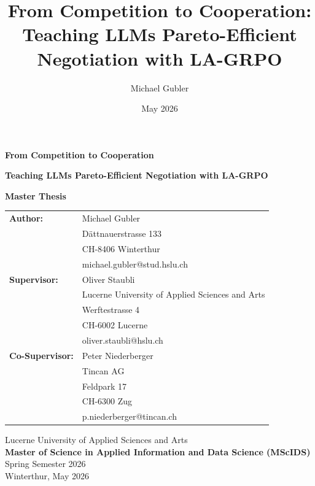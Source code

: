 \documentclass[12pt,a4paper]{article}
\title{From Competition to Cooperation:\\Teaching LLMs Pareto-Efficient Negotiation with LA-GRPO}
\author{Michael Gubler}
\date{May 2026}
\begin{document}
\begin{titlepage}
    \thispagestyle{empty}
    \centering

    {\LARGE \textbf{From Competition to Cooperation}\par}
    \vspace{0.4cm}
    {\large \textbf{Teaching LLMs Pareto-Efficient Negotiation with LA-GRPO}\par}
    \vspace{0.6cm}
    {\large \textbf{Master Thesis}\par}

    \vspace{1.5cm}

    \begin{flushleft}
    \begin{tabular}{@{}l p{9cm}@{}}
        \textbf{Author:} & Michael Gubler \\
                         & Dättnauerstrasse 133 \\
                         & CH-8406 Winterthur \\
                         & michael.gubler@stud.hslu.ch \\[1.0em]

        \textbf{Supervisor:} & Oliver Staubli \\
                             & Lucerne University of Applied Sciences and Arts \\
                             & Werftestrasse 4 \\
                             & CH-6002 Lucerne \\
                             & oliver.staubli@hslu.ch \\[1.0em]

        \textbf{Co-Supervisor:} & Peter Niederberger \\
                                & Tincan AG \\
                                & Feldpark 17 \\
                                & CH-6300 Zug \\
                                & p.niederberger@tincan.ch \\
    \end{tabular}
    \end{flushleft}

    \vfill

    \centering
    Lucerne University of Applied Sciences and Arts \\[0.2cm]
    \textbf{Master of Science in Applied Information and Data Science (MScIDS)} \\[0.2cm]
    Spring Semester 2026 \\[1.2cm]

    Winterthur, May 2026
\end{titlepage}
\end{document}
